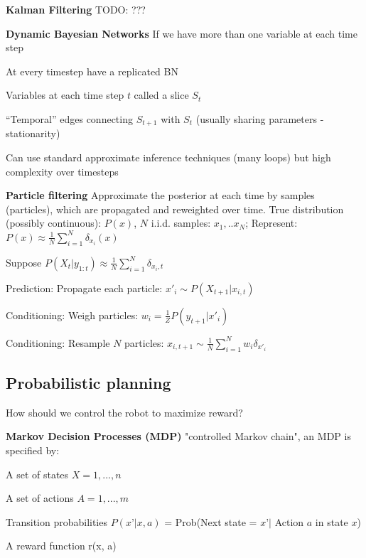 \documentclass[a4paper, 11pt, landscape]{article}
\begin{document}
\begin{multicols*}{3}
\textbf{Kalman Filtering}
TODO: ???

\textbf{Dynamic Bayesian Networks}
If we have more than one variable at each time step
\begin{compactitem}
	\item At every timestep have a replicated BN
	\item Variables at each time step $t$ called a slice $S_t$
	\item “Temporal” edges connecting $S_{t+1}$ with $S_t$ (usually sharing parameters - stationarity)
	\item Can use standard approximate inference techniques (many loops) but high complexity over timesteps
\end{compactitem}


\textbf{Particle filtering}
Approximate the posterior at each time by samples (particles), which are propagated and reweighted over time.
True distribution (possibly continuous): $P(x)$, $N$ i.i.d. samples: $x_1,..x_N$; Represent: $P(x) \approx \frac{1}{N} \sum_{i=1}^{N} \delta_{x_i}(x)$

\begin{compactitem}
	\item Suppose $P(X_t | y_{1:t}) \approx \frac{1}{N} \sum_{i=1}^{N} \delta_{x_i, t}$
	\item Prediction: Propagate each particle: $x'_i \sim P(X_{t+1} | x_{i,t})$
	\item Conditioning: Weigh particles: $w_i = \frac{1}{Z}P(y_{t+1} | x'_i)$
	\item Conditioning: Resample $N$ particles: $x_{i, t+1} \sim \frac{1}{N} \sum_{i=1}^{N} w_i\delta_{x'_i}$ 
\end{compactitem}

\subsection{Probabilistic planning}
How should we control the robot to maximize reward?

\textbf{Markov Decision Processes (MDP)}
"controlled Markov chain", an MDP is specified by:
\begin{compactitem}
	\item A set of states $X={1,...,n}$
	\item A set of actions $A={1,...,m}$
	\item Transition probabilities $P(x’ | x, a)$ = Prob(Next state = $x’ |$ Action $a$ in state $x$)
	\item A reward function r(x, a)
	

\end{compactitem}
\end{multicols*}
\end{document}
